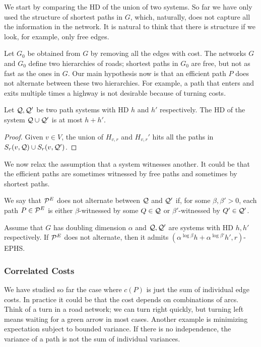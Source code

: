 
We start by comparing the HD of the union of two systems.
So far we have only used the structure of shortest paths in $G$, which, naturally, does not capture all the information in the network.
It is natural to think that there is structure if we look, for example, only free edges.

Let $G_0$ be obtained from $G$ by removing all the edges with cost.
The networks $G$ and $G_0$ define two hierarchies of roads; shortest paths in $G_0$ are free, but not as fast as the ones in $G$.
Our main hypothesis now is that an efficient path $P$ does not alternate between these two hierarchies.
For example, a path that enters and exits multiple times a highway is not desirable because of turning costs.

\begin{proposition}
Let $\mathcal{Q},\mathcal{Q}'$ be two path systems with HD $h$ and $h'$ respectively.
The HD of the system $\mathcal{Q}\cup\mathcal{Q}'$ is at most $h+h'$.
\end{proposition}
\begin{proof}
Given $v\in V$, the union of $H_{v,r}$ and $H_{v,r}'$ hits all the paths in $S_r(v,\mathcal{Q})\cup S_r(v,\mathcal{Q}')$.
\end{proof}

We now relax the assumption that a system witnesses another.
It could be that the efficient paths are sometimes witnessed by free paths and sometimes by shortest paths.

\begin{definition}
We say that $\mathcal{P}^E$ does not alternate between $\mathcal{Q}$ and $\mathcal{Q}'$ if, for some $\beta,\beta'>0$, each path $P\in\mathcal{P}^E$ is either $\beta$-witnessed by some $Q\in\mathcal{Q}$ or $\beta'$-witnessed by $Q'\in\mathcal{Q}'$.
\end{definition}

\begin{theorem}
Assume that $G$ has doubling dimension $\alpha$ and $\mathcal{Q},\mathcal{Q}'$ are systems with HD $h,h'$ respectively.
If $\mathcal{P}^E$ does not alternate, then it admits $(\alpha^{\log\beta}h+\alpha^{\log\beta'}h',r)$-EPHS.
\end{theorem}


\subsubsection{Correlated Costs}
We have studied so far the case where $c(P)$ is just the sum of individual edge costs.
In practice it could be that the cost depends on combinations of arcs.
Think of a turn in a road network; we can turn right quickly, but turning left means waiting for a green arrow in most cases.
Another example is minimizing expectation subject to bounded variance.
If there is no independence, the variance of a path is not the sum of individual variances.

